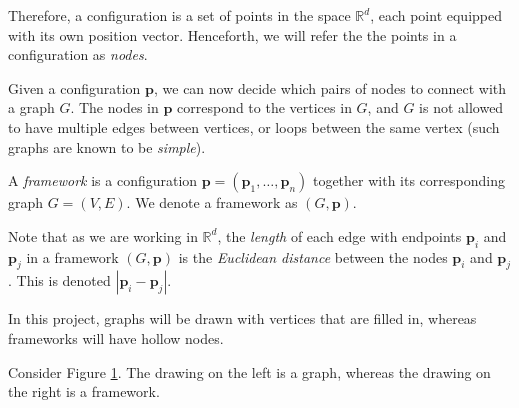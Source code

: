 \begin{flushleft}
Therefore, a configuration is a set of points in the space $\mathbb{R}^d$, each point equipped with its own position vector. Henceforth, we will refer the the points in a configuration as \textit{nodes}. 
\end{flushleft}

\begin{flushleft}
Given a configuration $\mathbf{p}$, we can now decide which pairs of nodes to connect with a graph $G$. The nodes in $\mathbf{p}$ correspond to the vertices in $G$, and $G$ is not allowed to have multiple edges between vertices, or loops between the same vertex (such graphs are known to be \textit{simple}).
\end{flushleft}

\begin{definition}
    A \textit{framework} is a configuration $\mathbf{p} = (\mathbf{p}_1, \hdots, \mathbf{p}_n)$ together with its corresponding graph $G = (V,E)$. We denote a framework as $(G,\mathbf{p})$.
\end{definition}

\begin{flushleft}
Note that as we are working in $\mathbb{R}^d$, the \textit{length} of each edge with endpoints $\mathbf{p}_i$ and $\mathbf{p}_j$ in a framework $(G,\mathbf{p})$ is the \textit{Euclidean distance} between the nodes $\mathbf{p}_i$ and $\mathbf{p}_j$. This is denoted $|\mathbf{p}_i - \mathbf{p}_j|$.

In this project, graphs will be drawn with vertices that are filled in, whereas frameworks will have hollow nodes. 
\end{flushleft}


\begin{example}
\label{g vs f}
Consider Figure \ref{fig: graph vs framework}. The drawing on the left is a graph, whereas the drawing on the right is a framework.
    \begin{figure}[htbp]
        \centering
        
        \caption{}
        \label{fig: graph vs framework}
    \end{figure}
\end{example}

